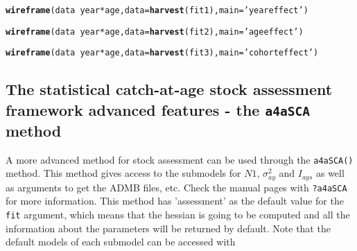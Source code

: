 \documentclass[a4paper,english,10pt]{article}\usepackage[]{graphicx}\usepackage[]{color}
\makeatletter
\newcommand{\hlstr}[1]{\textcolor[rgb]{0.192,0.494,0.8}{#1}}%
\newcommand{\hlopt}[1]{\textcolor[rgb]{0,0,0}{#1}}%
\newcommand{\hlstd}[1]{\textcolor[rgb]{0.345,0.345,0.345}{#1}}%
\newcommand{\hlkwc}[1]{\textcolor[rgb]{0.333,0.667,0.333}{#1}}%
\newcommand{\hlkwd}[1]{\textcolor[rgb]{0.737,0.353,0.396}{\textbf{#1}}}%
\newenvironment{kframe}{%
 \def\at@end@of@kframe{}%
 \ifinner\ifhmode%
  \def\at@end@of@kframe{\end{minipage}}%
  \begin{minipage}{\columnwidth}%
 \fi\fi%
 \def\FrameCommand##1{\hskip\@totalleftmargin \hskip-\fboxsep
 \colorbox{shadecolor}{##1}\hskip-\fboxsep
     \hskip-\linewidth \hskip-\@totalleftmargin \hskip\columnwidth}%
 \MakeFramed {\advance\hsize-\width
   \@totalleftmargin\z@ \linewidth\hsize
   \@setminipage}}%
 {\par\unskip\endMakeFramed%
 \at@end@of@kframe}
\newenvironment{knitrout}{}{} %
\newcommand{\code}[1]{{\texttt{#1}}}
\makeatother
\begin{document}
\begin{knitrout}
\color{fgcolor}\begin{kframe}
\begin{alltt}
\hlkwd{wireframe}\hlstd{(data}\hlopt{~}\hlstd{year}\hlopt{*}\hlstd{age,} \hlkwc{data}\hlstd{=}\hlkwd{harvest}\hlstd{(fit1),} \hlkwc{main}\hlstd{=}\hlstr{'year effect'}\hlstd{)}
\end{alltt}


{\ttfamily\noindent\bfseries{}}\begin{alltt}
\hlkwd{wireframe}\hlstd{(data}\hlopt{~}\hlstd{year}\hlopt{*}\hlstd{age,} \hlkwc{data}\hlstd{=}\hlkwd{harvest}\hlstd{(fit2),} \hlkwc{main}\hlstd{=}\hlstr{'age effect'}\hlstd{)}
\end{alltt}


{\ttfamily\noindent\bfseries{}}\begin{alltt}
\hlkwd{wireframe}\hlstd{(data}\hlopt{~}\hlstd{year}\hlopt{*}\hlstd{age,} \hlkwc{data}\hlstd{=}\hlkwd{harvest}\hlstd{(fit3),} \hlkwc{main}\hlstd{=}\hlstr{'cohort effect'}\hlstd{)}
\end{alltt}


{\ttfamily\noindent\bfseries{}}\end{kframe}
\end{knitrout}

\subsection{The statistical catch-at-age stock assessment framework advanced features - the \code{a4aSCA} method}

A more advanced method for stock assessment can be used through the \code{a4aSCA()} method. This method gives access to the submodels for $N1$, $\sigma^2_{ay}$ and $I_{ays}$ as well as arguments to get the ADMB files, etc. Check the manual pages with \code{?a4aSCA} for more information. This method has 'assessment' as the default value for the \code{fit} argument, which means that the hessian is going to be computed and all the information about the parameters will be returned by default. Note that the default models of each submodel can be accessed with
\end{document}
